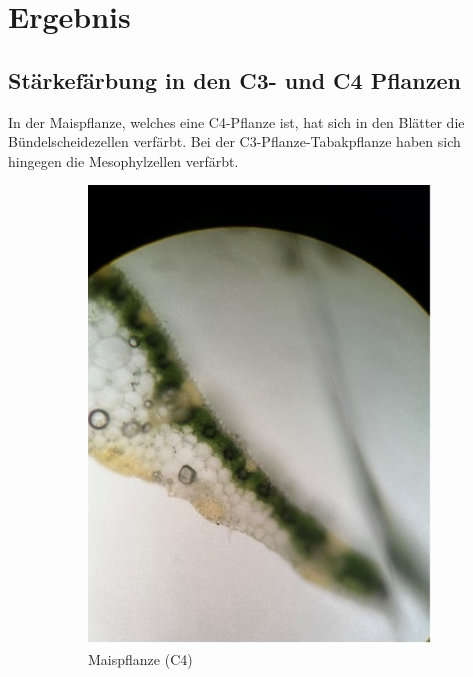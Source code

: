 \documentclass[10pt,a4paper]{article}
\begin{document}
	\section{Ergebnis}
	\subsection{Stärkefärbung in den C3- und C4 Pflanzen}
	In der Maispflanze, welches eine C4-Pflanze ist, hat sich in den Blätter die Bündelscheidezellen verfärbt. Bei der C3-Pflanze-Tabakpflanze haben sich hingegen die Mesophylzellen verfärbt.
		\begin{figure}[H]
			\centering
			\begin{subfigure}[b]{0.31\textwidth}
				\includegraphics[width=\textwidth]{Maisquerschnitt.jpg}
				\caption{Maispflanze (C4)}
				\label{fig:mais färbung}
			\end{subfigure}
			\hfil
			\begin{subfigure}[b]{0.311\textwidth}

\end{subfigure}
\end{figure}
\end{document}
